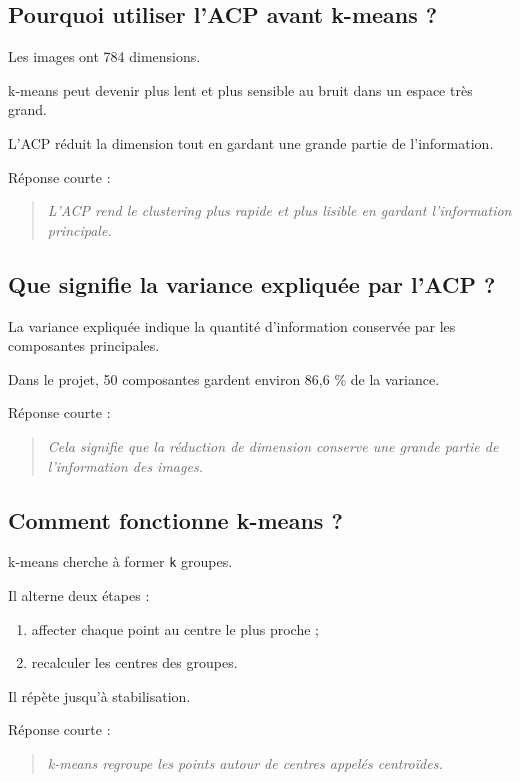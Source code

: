\documentclass[11pt,a4paper]{article}
\begin{document}
\subsection{Pourquoi utiliser l'ACP avant k-means ?}

Les images ont 784 dimensions.

k-means peut devenir plus lent et plus sensible au bruit dans un espace très grand.

L'ACP réduit la dimension tout en gardant une grande partie de l'information.

Réponse courte :

\begin{quote}
\itshape L'ACP rend le clustering plus rapide et plus lisible en gardant l'information principale.
\end{quote}

\subsection{Que signifie la variance expliquée par l'ACP ?}

La variance expliquée indique la quantité d'information conservée par les composantes principales.

Dans le projet, 50 composantes gardent environ 86,6 \% de la variance.

Réponse courte :

\begin{quote}
\itshape Cela signifie que la réduction de dimension conserve une grande partie de l'information des images.
\end{quote}

\subsection{Comment fonctionne k-means ?}

k-means cherche à former \texttt{k} groupes.

Il alterne deux étapes :

\begin{enumerate}
\item affecter chaque point au centre le plus proche ;
\item recalculer les centres des groupes.
\end{enumerate}

Il répète jusqu'à stabilisation.

Réponse courte :

\begin{quote}
\itshape k-means regroupe les points autour de centres appelés centroïdes.
\end{quote}
\end{document}
